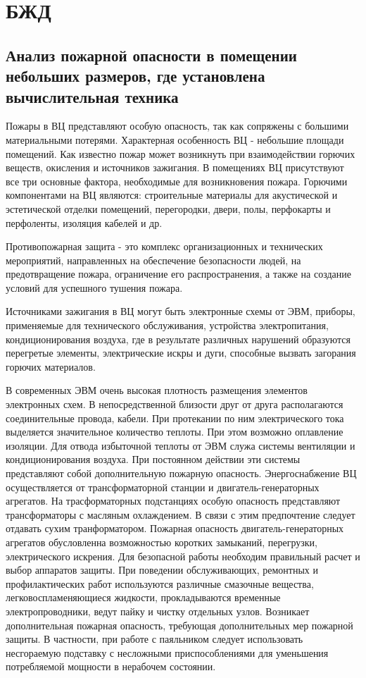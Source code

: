 \section{БЖД}

\subsection{Анализ пожарной опасности в помещении небольших размеров, где установлена вычислительная техника}

Пожары в ВЦ представляют особую опасность, так как сопряжены с большими материальными потерями.
Характерная особенность ВЦ - небольшие площади помещений. Как известно пожар может возникнуть при взаимодействии
горючих веществ, окисления и источников зажигания. В помещениях ВЦ присутствуют все три основные фактора,
необходимые для возникновения пожара. Горючими компонентами на ВЦ являются: строительные материалы для
акустической и эстетической отделки помещений, перегородки, двери, полы, перфокарты и перфоленты, изоляция кабелей и др.

Противопожарная защита - это комплекс организационных и технических мероприятий, направленных на обеспечение безопасности людей,
на предотвращение пожара, ограничение его распространения, а также на создание условий для успешного тушения пожара.

Источниками зажигания в ВЦ могут быть электронные схемы от ЭВМ, приборы, применяемые для технического обслуживания,
устройства электропитания, кондиционирования воздуха, где в результате различных нарушений образуются перегретые элементы,
электрические искры и дуги, способные вызвать загорания горючих материалов.

В современных ЭВМ очень высокая плотность размещения элементов электронных схем. В непосредственной близости
друг от друга располагаются соединительные провода, кабели. При протекании по ним электрического тока выделяется
значительное количество теплоты. При этом возможно оплавление изоляции. Для отвода избыточной теплоты от ЭВМ служа
системы вентиляции и кондиционирования воздуха. При постоянном действии эти системы представляют собой дополнительную
пожарную опасность. Энергоснабжение ВЦ осуществляется от трансформаторной станции и двигатель-генераторных агрегатов.
На трасформаторных подстанциях особую опасность представляют трансформаторы с масляным охлаждением. В связи с этим
предпочтение следует отдавать сухим транформатором. Пожарная опасность двигатель-генераторных агрегатов обусловленна
возможностью коротких замыканий, перегрузки, электрического искрения. Для безопасной работы необходим правильный
расчет и выбор аппаратов защиты. При поведении обслуживающих, ремонтных и профилактических работ используются
различные смазочные вещества, легковоспламеняющиеся жидкости, прокладываются временные электропроводники, ведут пайку
и чистку отдельных узлов. Возникает дополнительная пожарная опасность, требующая дополнительных мер пожарной защиты.
В частности, при работе с паяльником следует использовать несгораемую подставку с несложными приспособлениями
для уменьшения потребляемой мощности в нерабочем состоянии.

